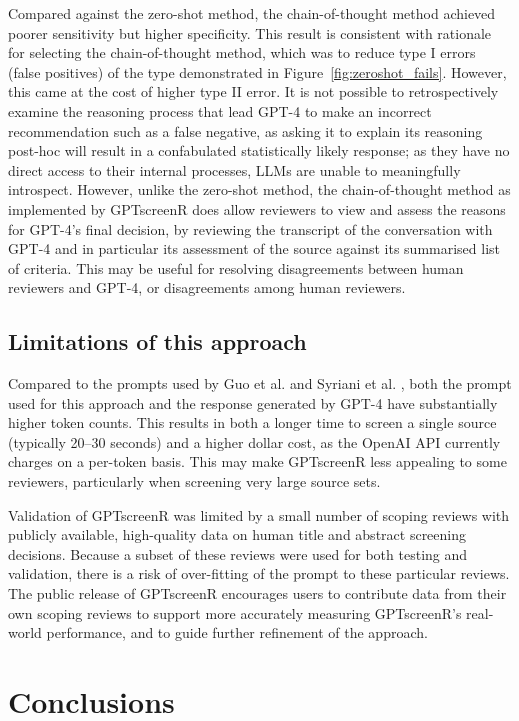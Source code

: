 \documentclass[10pt,a4paper,twocolumn]{article}
\begin{document}
Compared against the zero-shot method, the chain-of-thought method achieved poorer sensitivity but higher specificity. This result is consistent with rationale for selecting the chain-of-thought method, which was to reduce type I errors (false positives) of the type demonstrated in Figure~\ref{fig:zeroshot_fails}. However, this came at the cost of higher type II error. It is not possible to retrospectively examine the reasoning process that lead GPT-4 to make an incorrect recommendation such as a false negative, as asking it to explain its reasoning post-hoc will result in a confabulated statistically likely response; as they have no direct access to their internal processes, LLMs are unable to meaningfully introspect. However, unlike the zero-shot method, the chain-of-thought method as implemented by GPTscreenR does allow reviewers to view and assess the reasons for GPT-4's final decision, by reviewing the transcript of the conversation with GPT-4 and in particular its assessment of the source against its summarised list of criteria. This may be useful for resolving disagreements between human reviewers and GPT-4, or disagreements among human reviewers.

\subsection{Limitations of this approach}

Compared to the prompts used by Guo et al. \cite{Guo.2023} and Syriani et al. \cite{Syriani.2023}, both the prompt used for this approach and the response generated by GPT-4 have substantially higher token counts. This results in both a longer time to screen a single source (typically 20--30 seconds) and a higher dollar cost, as the OpenAI API currently charges on a per-token basis. This may make GPTscreenR less appealing to some reviewers, particularly when screening very large source sets.

Validation of GPTscreenR was limited by a small number of scoping reviews with publicly available, high-quality data on human title and abstract screening decisions. Because a subset of these reviews were used for both testing and validation, there is a risk of over-fitting of the prompt to these particular reviews. The public release of GPTscreenR encourages users to contribute data from their own scoping reviews to support more accurately measuring GPTscreenR's real-world performance, and to guide further refinement of the approach.

\section{Conclusions}
\end{document}
